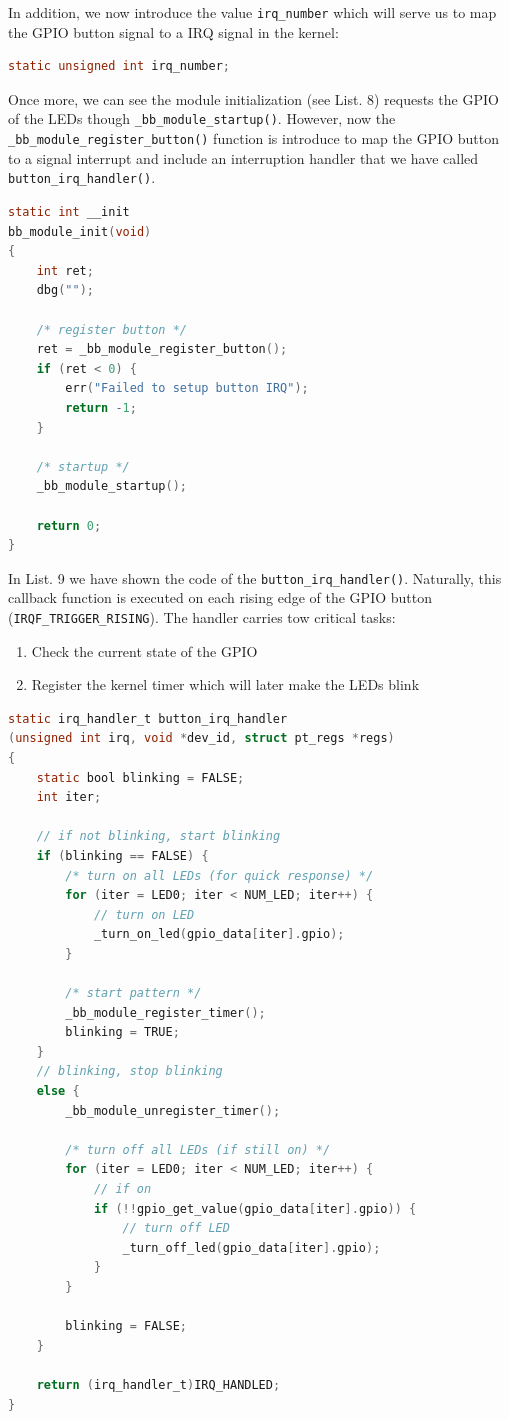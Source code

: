\documentclass[letterpaper,12pt] {article}
\begin{document}
In addition, we now introduce the value \texttt{irq\_number} which will serve us to map the GPIO button signal to a IRQ signal in the kernel:\\

\begin{lstlisting}[firstnumber = 63 ,language=C    ]
static unsigned int irq_number;
\end{lstlisting}

Once more, we can see the module initialization (see List. 8) requests the GPIO of the LEDs though \texttt{\_bb\_module\_startup()}. However, now the \texttt{\_bb\_module\_register\_button()} function is introduce to map the GPIO button to a signal interrupt and include an interruption handler that we have called \texttt{button\_irq\_handler()}.\\


\begin{lstlisting}[firstnumber = 300 ,language=C , caption =  Introduction of GPIO interrupt   ]
static int __init
bb_module_init(void)
{
	int ret;
	dbg("");
	
	/* register button */
	ret = _bb_module_register_button();
	if (ret < 0) {
		err("Failed to setup button IRQ");
		return -1;
	}
	
	/* startup */
	_bb_module_startup();
	
	return 0;
}
\end{lstlisting}

In List. 9 we have shown the code of the \texttt{button\_irq\_handler()}. Naturally, this callback function is executed on each rising edge of the GPIO button (\texttt{IRQF\_TRIGGER\_RISING}). The handler carries tow critical tasks: 
\begin{enumerate}
\item Check the current state of the GPIO 
\item Register the kernel timer which will later make the LEDs blink 
\end{enumerate}

\begin{lstlisting}[firstnumber = 193 ,language=C , caption =  GPIO Interruption handling function   ]
static irq_handler_t button_irq_handler
(unsigned int irq, void *dev_id, struct pt_regs *regs)
{
	static bool blinking = FALSE;
	int iter;
	
	// if not blinking, start blinking
	if (blinking == FALSE) {
		/* turn on all LEDs (for quick response) */
		for (iter = LED0; iter < NUM_LED; iter++) {
			// turn on LED
			_turn_on_led(gpio_data[iter].gpio);
		}
		
		/* start pattern */
		_bb_module_register_timer();
		blinking = TRUE;
	}
	// blinking, stop blinking
	else {
		_bb_module_unregister_timer();
		
		/* turn off all LEDs (if still on) */
		for (iter = LED0; iter < NUM_LED; iter++) {
			// if on
			if (!!gpio_get_value(gpio_data[iter].gpio)) {
				// turn off LED
				_turn_off_led(gpio_data[iter].gpio);
			}
		}
		
		blinking = FALSE;
	}
	
	return (irq_handler_t)IRQ_HANDLED;
}
\end{lstlisting}
\end{document}
